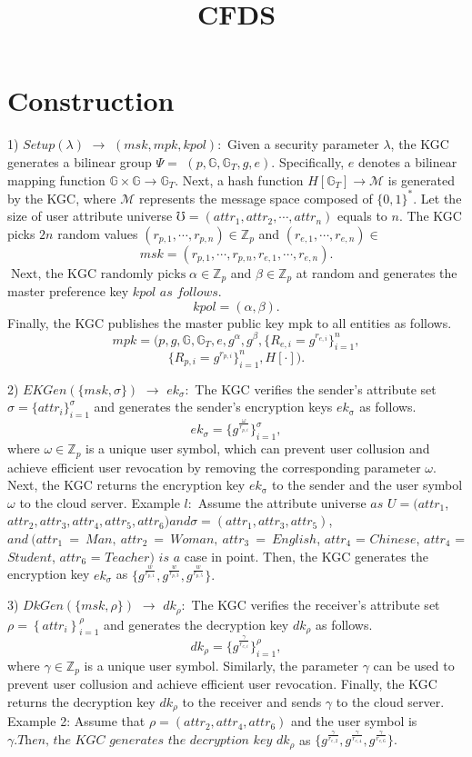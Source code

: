 \documentclass[runningheads]{llncs}
\begin{document}
\title{CFDS}

\section{Construction}
1) $\textit{Setup}( \lambda )$ $\to$ $( msk, mpk, kpol) {: }$ Given a security parameter $\lambda$, the KGC generates a bilinear group $\Psi=$ $(p,\mathbb{G},\mathbb{G}_T,g,e).$ Specifically, $e$ denotes a bilinear mapping function $\mathbb{G}\times\mathbb{G}\to\mathbb{G}_T.$ Next, a hash function $H[\mathbb{G}_T]\to\mathcal{M}$ is generated by the KGC, where $\mathcal{M}$ represents the message space composed of $\{0,1\}^*.$ Let the size of user attribute universe $\mho=(attr_1,attr_2,\cdots,attr_n)$ equals to $n.$ The KGC picks $2n$ random values $(r_{p,1},\cdots,r_{p,n})\in\mathbb{Z}_p$ and $(r_{e,1},\cdots,r_{e,n})\in$
$$msk=(r_{p,1},\cdots,r_{p,n},r_{e,1},\cdots,r_{e,n}).$$
$\operatorname*{Next,\text{ the KGC randomly picks }}\alpha\in\mathbb{Z}_p$ and $\beta\in\mathbb{Z}_p$ at random
and generates the master preference key $k\textit{pol as follows. }$
$$kpol=(\alpha,\beta).$$
Finally, the KGC publishes the master public key mpk to all entities as follows.
$$mpk=(p,g,\mathbb{G},\mathbb{G}_T,e,g^\alpha,g^\beta,\{R_{e,i}=g^{r_{e,i}}\}_{i=1}^n,$$
$$\{R_{p,i}=g^{r_{p,i}}\}_{i=1}^n,H[\cdot]).$$

2) $EKGen( \{ msk, \sigma \} )$ $\to$ $ek_\sigma {: }$ The KGC verifies the sender's attribute set $\sigma=\{attr_i\}_{i=1}^\sigma$ and generates the sender's encryption keys $ek_\mathrm{\sigma}$ as follows.
$$ek_\sigma=\{g^{\frac\omega{r_{p,i}}}\}_{i=1}^\sigma,$$
where $\omega\in\mathbb{Z}_p$ is a unique user symbol, which can prevent user collusion and achieve efficient user revocation by removing the corresponding parameter $\omega.$ Next, the KGC returns the encryption key $ek_\mathrm{\sigma}$ to the sender and the user symbol $\omega$ to the cloud server.
Example $l:$ Assume the attribute universe $as$ $U= ( attr_1$, $attr_{2},attr_{3},attr_{4},attr_{5},attr_{6})and\sigma=(attr_{1},attr_{3},attr_{5})$, $and~(attr_{1}~=~Man,~attr_{2}~=~Woman,~attr_{3}~=~English$, $attr_{4}$ = $Chinese$, $attr_{4}$ = $Student$, $attr_{6}$ = $Teacher)$ $is$ $a$ case in point. Then, the KGC generates the encryption key $ek_{\sigma}$ as $\{g^{\frac{w}{r_{p,1}}},g^{\frac{w}{r_{p,3}}},g^{\frac{w}{r_{p,5}}}\}.$

3) $DkGen( \{ msk, \rho \} )$ $\to$ $dk_\rho {: }$ The KGC verifies the receiver's attribute set $\rho=\left\{attr_i\right\}_{i=1}^\rho$ and generates the decryption key $dk_\rho$ as follows.
$$dk_\rho=\{g^{\frac\gamma{r_{e,i}}}\}_{i=1}^\rho,$$
where $\gamma\in\mathbb{Z}_p$ is a unique user symbol. Similarly, the parameter $\gamma$ can be used to prevent user collusion and achieve efficient user revocation. Finally, the KGC returns the decryption key $dk_\rho$ to the receiver and sends $\gamma$ to the cloud server.
Example 2: Assume that $\rho = ( attr_{2}, attr_{4}, attr_{6})$ and the user symbol is $\gamma . \textit{Then, the KGC generates the decryption key}$ $dk_{\rho}$ as $\{g^\frac\gamma{r_{e,2}},g^{\frac\gamma{r_{e,4}}},g^{\frac\gamma{r_{e,6}}}\}.$
\end{document}
